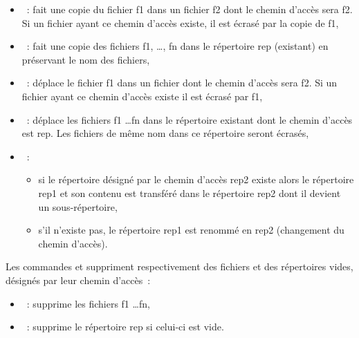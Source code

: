 \documentclass[a4paper,11pt]{article}
\begin{document}
\begin{itemize}
  \item {} : fait une copie du fichier f1 dans un fichier f2
        dont le chemin d'accès sera f2. 
        Si un fichier ayant ce chemin d'accès existe, il est écrasé par la
        copie de f1,\\
  \item {} : fait une copie des fichiers f1, \ldots,
        fn dans le répertoire rep (existant) en préservant le nom des
        fichiers,\\
  \item {} : déplace le fichier f1  dans un fichier dont le chemin
        d'accès sera f2. Si un fichier ayant ce chemin d'accès existe il est
        écrasé par f1, \\
  \item {} : déplace les fichiers f1 \ldots fn dans le
        répertoire existant  dont le chemin d'accès est rep.
        Les fichiers de même nom dans ce répertoire seront écrasés,\\
  \item {} : 
        \begin{itemize}
          \item si le répertoire désigné par le chemin d'accès rep2 existe
                alors le répertoire rep1 et son contenu est transféré dans le
                répertoire rep2 dont il devient un sous-répertoire,
          \item s'il n'existe pas, le répertoire rep1 est renommé en rep2
                (changement du chemin d'accès).
        \end{itemize}
\end{itemize}

Les commandes  et  suppriment respectivement des
fichiers et des répertoires vides, désignés par leur chemin d'accès :

\begin{itemize}
  \item {} : supprime les fichiers f1 \ldots fn,
  \item {} : supprime le répertoire rep si celui-ci est vide.
\end{itemize}

% 
\end{document}
